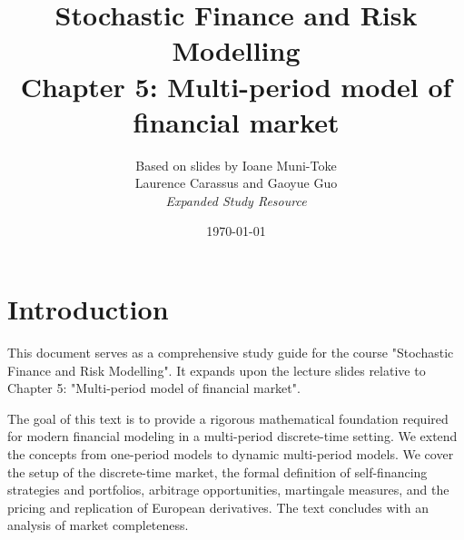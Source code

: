 \documentclass[12pt, a4paper]{report}
\title{\textbf{Stochastic Finance and Risk Modelling} \\ \large Chapter 5: Multi-period model of financial market}
\author{Based on slides by Ioane Muni-Toke \\ Laurence Carassus and Gaoyue Guo \\ \textit{Expanded Study Resource}}
\date{\today}
\theoremstyle{definition}
\begin{document}
\maketitle

\tableofcontents

\chapter*{Introduction}
This document serves as a comprehensive study guide for the course "Stochastic Finance and Risk Modelling". It expands upon the lecture slides relative to Chapter 5: "Multi-period model of financial market". 

The goal of this text is to provide a rigorous mathematical foundation required for modern financial modeling in a multi-period discrete-time setting. We extend the concepts from one-period models to dynamic multi-period models. We cover the setup of the discrete-time market, the formal definition of self-financing strategies and portfolios, arbitrage opportunities, martingale measures, and the pricing and replication of European derivatives. The text concludes with an analysis of market completeness.





\end{document}
